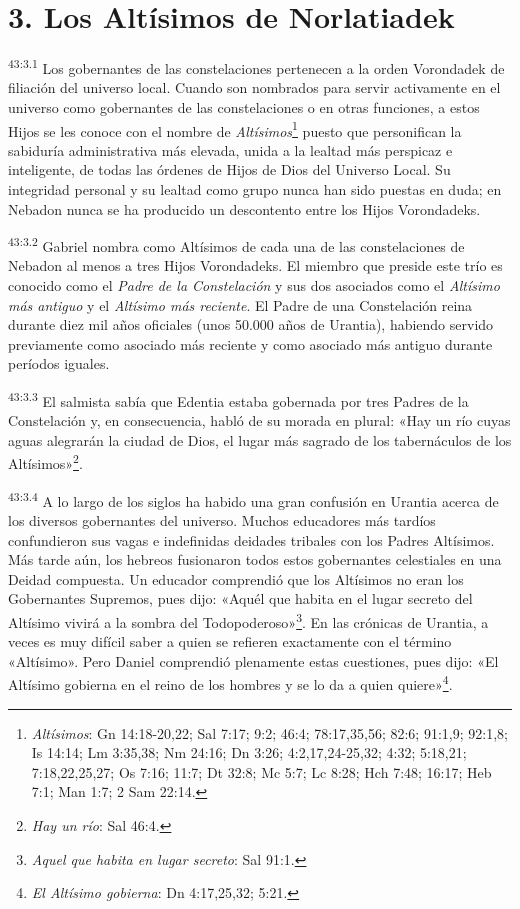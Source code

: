 \section*{3. Los Altísimos de Norlatiadek}
\par
\textsuperscript{43:3.1} Los gobernantes de las constelaciones pertenecen a la orden Vorondadek de filiación del universo local. Cuando son nombrados para servir activamente en el universo como gobernantes de las constelaciones o en otras funciones, a estos Hijos se les conoce con el nombre de \textit{Altísimos}\footnote{\textit{Altísimos}: Gn 14:18-20,22; Sal 7:17; 9:2; 46:4; 78:17,35,56; 82:6; 91:1,9; 92:1,8; Is 14:14; Lm 3:35,38; Nm 24:16; Dn 3:26; 4:2,17,24-25,32; 4:32; 5:18,21; 7:18,22,25,27; Os 7:16; 11:7; Dt 32:8; Mc 5:7; Lc 8:28; Hch 7:48; 16:17; Heb 7:1; Man 1:7; 2 Sam 22:14.} puesto que personifican la sabiduría administrativa más elevada, unida a la lealtad más perspicaz e inteligente, de todas las órdenes de Hijos de Dios del Universo Local. Su integridad personal y su lealtad como grupo nunca han sido puestas en duda; en Nebadon nunca se ha producido un descontento entre los Hijos Vorondadeks.

\par
\textsuperscript{43:3.2} Gabriel nombra como Altísimos de cada una de las constelaciones de Nebadon al menos a tres Hijos Vorondadeks. El miembro que preside este trío es conocido como el \textit{Padre de la Constelación} y sus dos asociados como el \textit{Altísimo más antiguo} y el \textit{Altísimo más reciente}. El Padre de una Constelación reina durante diez mil años oficiales (unos 50.000 años de Urantia), habiendo servido previamente como asociado más reciente y como asociado más antiguo durante períodos iguales.

\par
\textsuperscript{43:3.3} El salmista sabía que Edentia estaba gobernada por tres Padres de la Constelación y, en consecuencia, habló de su morada en plural: «Hay un río cuyas aguas alegrarán la ciudad de Dios, el lugar más sagrado de los tabernáculos de los Altísimos»\footnote{\textit{Hay un río}: Sal 46:4.}.

\par
\textsuperscript{43:3.4} A lo largo de los siglos ha habido una gran confusión en Urantia acerca de los diversos gobernantes del universo. Muchos educadores más tardíos confundieron sus vagas e indefinidas deidades tribales con los Padres Altísimos. Más tarde aún, los hebreos fusionaron todos estos gobernantes celestiales en una Deidad compuesta. Un educador comprendió que los Altísimos no eran los Gobernantes Supremos, pues dijo: «Aquél que habita en el lugar secreto del Altísimo vivirá a la sombra del Todopoderoso»\footnote{\textit{Aquel que habita en lugar secreto}: Sal 91:1.}. En las crónicas de Urantia, a veces es muy difícil saber a quien se refieren exactamente con el término «Altísimo». Pero Daniel comprendió plenamente estas cuestiones, pues dijo: «El Altísimo gobierna en el reino de los hombres y se lo da a quien quiere»\footnote{\textit{El Altísimo gobierna}: Dn 4:17,25,32; 5:21.}.

